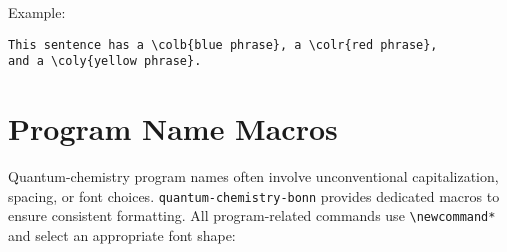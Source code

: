 \documentclass[a4paper,12pt]{article}
\begin{document}
\noindent Example:
\begin{verbatim}
This sentence has a \colb{blue phrase}, a \colr{red phrase}, 
and a \coly{yellow phrase}.
\end{verbatim}

\section{Program Name Macros}
\label{sec:programs}
Quantum-chemistry program names often involve unconventional capitalization, spacing, or font choices. \texttt{quantum-chemistry-bonn} provides dedicated macros to ensure consistent formatting. All program-related commands use \verb|\newcommand*| and select an appropriate font shape:
\end{document}
